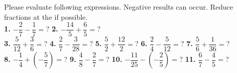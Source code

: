 \documentclass[a4paper]{article}
\begin{document}
\begin{Large}

Please evaluate following expressions. Negative results can occur. Reduce fractions at the if possible.\\[1cm]

\textbf{1.} $- \dfrac{2}{7} - \dfrac{1}{7} =$? \hspace{0.2cm}
\textbf{2.} $- \dfrac{14}{5} + \dfrac{6}{5} =$? \\[1cm]
		
\textbf{3.} $\dfrac{5}{12} + \dfrac{3}{6} =$? \hspace{0.2cm}
\textbf{4.} $\dfrac{2}{7} - \dfrac{3}{28} =$? \hspace{0.2cm}
\textbf{5.} $\dfrac{5}{2} + \dfrac{12}{2} =$? \hspace{0.2cm}
\textbf{6.} $\dfrac{2}{4} - \dfrac{5}{12} =$? \hspace{0.2cm}
\textbf{7.} $\dfrac{5}{6} + \dfrac{1}{36} =$? \\[1cm]

\textbf{8.} $- \dfrac{1}{4} + (-\dfrac{5}{7}) =$? \hspace{0.2cm}
\textbf{9.} $\dfrac{4}{8} - \dfrac{2}{7} =$? \hspace{0.2cm}
\textbf{10.} $- \dfrac{11}{25} - (- \dfrac{2}{5}) =$? \hspace{0.2cm}
\textbf{11.} $\dfrac{6}{7} - \dfrac{4}{5} =$?

\end{Large}
\end{document}
